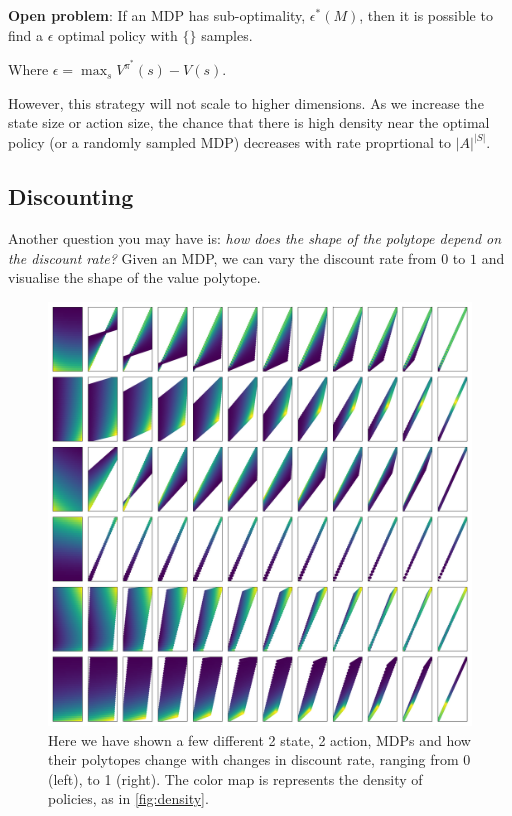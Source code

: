 \vspace{5mm}

\textbf{Open problem}\footnotemark[15]: If an MDP has sub-optimality,  $\epsilon^{* }(M)$,
then it is possible to find a $\epsilon$ optimal policy with $\{\}$ samples.


Where $\epsilon = \mathop{\text{max}}_s V^{\pi^{* }}(s) - V(s)$.

\vspace{5mm}

However, this strategy will not scale to higher dimensions.
As we increase the state size or action size, the chance that there is high
density near the optimal policy (or a randomly sampled MDP) decreases with rate proprtional to $|A|^{|S|}$.


\subsection{Discounting}

Another question you may have is: \textit{how does the shape of the polytope depend on the discount rate?}
Given an MDP, we can vary the discount rate from \(0\) to \(1\) and visualise
the shape of the value polytope.

\begin{figure}
\centering
\includegraphics[width=1\textwidth,height=1\textheight]{../../pictures/figures/discounts.png}
\caption{Here we have shown a few different 2 state, 2 action, MDPs and how
their polytopes change with changes in discount rate, ranging from 0 (left), to 1 (right).
The color map is represents the density of policies, as in \ref{fig:density}.}
\label{fig:polytope-discounts}
\end{figure}


